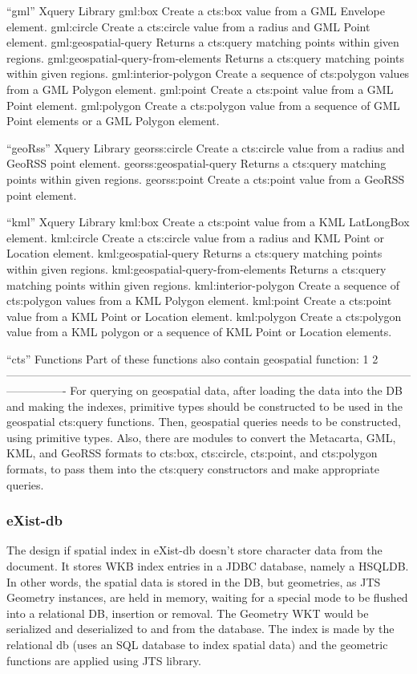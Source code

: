 \documentclass[a4paper,12pt]{article}
\begin{document}
“gml” Xquery Library
gml:box
Create a cts:box value from a GML Envelope element.
gml:circle
Create a cts:circle value from a radius and GML Point element.
gml:geospatial-query
Returns a cts:query matching points within given regions.
gml:geospatial-query-from-elements
Returns a cts:query matching points within given regions.
gml:interior-polygon
Create a sequence of cts:polygon values from a GML Polygon element.
gml:point
Create a cts:point value from a GML Point element.
gml:polygon
Create a cts:polygon value from a sequence of GML Point elements or a GML Polygon element.


“geoRss” Xquery Library
georss:circle
Create a cts:circle value from a radius and GeoRSS point element.
georss:geospatial-query
Returns a cts:query matching points within given regions.
georss:point
Create a cts:point value from a GeoRSS point element.

“kml” Xquery Library
kml:box
Create a cts:point value from a KML LatLongBox element.
kml:circle
Create a cts:circle value from a radius and KML Point or Location element.
kml:geospatial-query
Returns a cts:query matching points within given regions.
kml:geospatial-query-from-elements
Returns a cts:query matching points within given regions.
kml:interior-polygon
Create a sequence of cts:polygon values from a KML Polygon element.
kml:point
Create a cts:point value from a KML Point or Location element.
kml:polygon
Create a cts:polygon value from a KML polygon or a sequence of KML Point or Location elements.


“cts” Functions
Part of these functions also contain geospatial function: 1 2
----------------------------------------------------------------------------------------------------------------------------
For querying on geospatial data, after loading the data into the DB and making the indexes, primitive types should be constructed to be used in the geospatial cts:query functions. Then, geospatial queries needs to be constructed, using primitive types. 
Also, there are modules to convert the Metacarta, GML, KML, and GeoRSS formats to cts:box, cts:circle, cts:point, and cts:polygon formats, to pass them into the cts:query constructors and make appropriate queries.

\subsubsection{eXist-db}
The design if spatial index in eXist-db doesn't store character data from the document. It stores WKB index entries in a JDBC database, namely a HSQLDB. In other words, the spatial data is stored in the DB, but geometries, as JTS Geometry instances, are held in memory, waiting for a special mode to be flushed into a relational DB, insertion or removal. The Geometry WKT would be serialized and deserialized to and from the database.
The index is made by the relational db (uses an SQL database to index spatial data) and the geometric functions are applied using JTS library.
\end{document}
